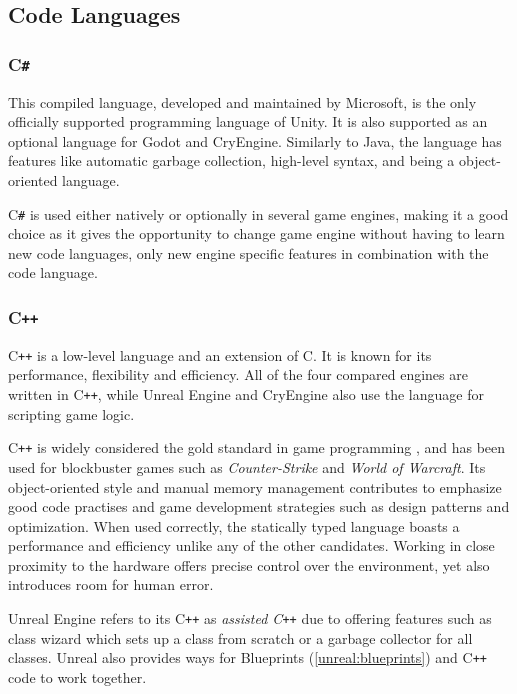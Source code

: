 

\subsection{Code Languages}
\subsubsection{C\texttt{\#}} \label{csharp}
This compiled language, developed and maintained by Microsoft, is the only officially supported programming language of Unity. \cite{unity_technologies_2021} It is also supported as an optional language for Godot and CryEngine. Similarly to Java, the language has features like automatic garbage collection, high-level syntax, and being a object-oriented language.

 C\texttt{\#} is used either natively or optionally in several game engines, making it a good choice as it gives the opportunity to change game engine without having to learn new code languages, only new engine specific features in combination with the code language.

\subsubsection{C\texttt{++}} \label{cpp}
C\texttt{++} is a low-level language and an extension of C. It is known for its performance, flexibility and efficiency. 
All of the four compared engines are written in C\texttt{++}, while Unreal Engine and CryEngine also use the language for scripting game logic.

C\texttt{++} is widely considered the gold standard in game programming \cite{terziyan_2020}, and has been used for blockbuster games such as \textit{Counter-Strike} and \textit{World of Warcraft}. Its object-oriented style and manual memory management contributes to emphasize good code practises and game development strategies such as design patterns and optimization. When used correctly, the statically typed language boasts a performance and efficiency unlike any of the other candidates. Working in close proximity to the hardware offers precise control over the environment, yet also introduces room for human error. 

Unreal Engine refers to its C\texttt{++} as \textit{assisted C\texttt{++}} due to offering features such as class wizard which sets up a class from scratch or a garbage collector for all classes. Unreal also provides ways for Blueprints (\ref{unreal:blueprints}) and C\texttt{++} code to work together.
\cite{unreal_engine_documentation_2021}

